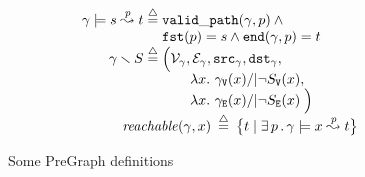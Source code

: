 \begin{figure}
\begin{minipage}{.5\textwidth}
\begin{equation*}
{\begin{array}{r@{}c@{}l}
      \gamma |= s \overset{\m{p}}{\leadsto} t \;&\defeq\;&
        \mathtt{valid\_path}(\gamma, p)\wedge \null \\
        &&\mathtt{fst}(p)=s \wedge \mathtt{end}(\gamma,p)=t \\
      \gamma \smallsetminus S \; &\defeq \;&
          \Big(\mathcal{V}_{\gamma},\mathcal{E}_{\gamma}, \mathtt{src}_{\gamma}, \mathtt{dst}_{\gamma}, \\
          &&\qquad \lambda x.~ \gamma_{\mathtt{V}}(x) /| \lnot S_{\mathtt{V}}(x), \\
          &&\qquad \lambda x.~ \gamma_{\mathtt{E}}(x) /| \lnot S_{\mathtt{E}}(x)\;\Big)\\
          && \hspace{-1cm}\mathit{reachable}(\gamma, x)\;\defeq\;\big\{t \mid \exists\,p\,.\, \gamma |= x \overset{\m{p}}{\leadsto} t\big\}
  \end{array}}
  \end{equation*}
  \end{minipage}
\vspace{-.7em}
\caption{Some PreGraph definitions}
\label{fig:pregraphdefs}
\vspace{-1em}
\end{figure}

